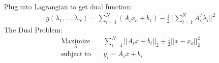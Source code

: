 \documentclass[12pt]{article}
\begin{document}
Plug into Lagrangian to get dual function:
\begin{equation*}
\begin{aligned}
& g(\lambda_1, \dots, \lambda_N) = \sum_{i=1}^{N}(A_ix_o + b_1)- \frac{1}{2}||\sum_{i=1}^{N}A_i^T\lambda_i||^2
\end{aligned}
\end{equation*}
The Dual Problem:
\begin{equation*}
\begin{aligned}
& \underset{\lambda}{\text{Maximize}}
& & \sum_{i=1}^{N}||A_ix+b_i||_2 + \frac{1}{2}||x-x_o||_2^2\\
& \text{subject to}\
& & y_i = A_ix+b_i\\
\end{aligned}
\end{equation*}
 
\end{document}

